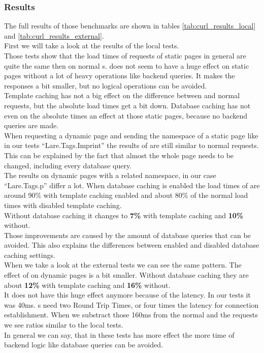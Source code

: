 \subsubsection{Results}

The full results of those benchmarks are shown in tables \ref{tab:curl_results_local} and \ref{tab:curl_results_external}.
\\
First we will take a look at the results of the local tests.
\\
Those tests show that the load times of \lare{} requests of static pages in general are quite the same then on normal \httpRequest{}s.
\lare{} does not seem to have a huge effect on static pages without a lot of heavy operations like backend queries. It makes the responses a bit smaller, but no logical operations can be avoided.
\\
Template caching has not a big effect on the difference between \lare{} and normal requests, but the absolute load times get a bit down.
Database caching has not even on the absolute times an effect at those static pages, because no backend queries are made.
\\
When requesting a dynamic page and sending the namespace of a static page like in our tests \enquote{Lare.Tags.Imprint} the results of \lare{} are still similar to normal requests.
This can be explained by the fact that almost the whole page needs to be changed, including every database query.
\\
The results on dynamic pages with a related namespace, in our case \enquote{Lare.Tags.p} differ a lot.
When database caching is enabled the load times of \lare{} are around 90\% with template caching enabled and about 80\% of the normal load times with disabled template caching.
\\
Without database caching it changes to \textbf{7\%} with template caching and \textbf{10\%} without.
\\
Those improvements are caused by the amount of database queries that can be avoided. This also explains the differences between enabled and disabled database caching settings.
\\
When we take a look at the external tests we can see the same pattern.
The effect of \lare{} on dynamic pages is a bit smaller.
Without database caching they are about \textbf{12\%} with template caching and \textbf{16\%} without.
\\
It does not have this huge effect anymore because of the latency.
In our tests it was 40ms.
\httpRequest{}s need two Round Trip Times, or four times the latency for connection establishment.
When we substract those 160ms from the normal and the \lare{} requests we see ratios similar to the local tests.
\\
In general we can say, that in these tests \lare{} has more effect the more time of backend logic like database queries can be avoided.

